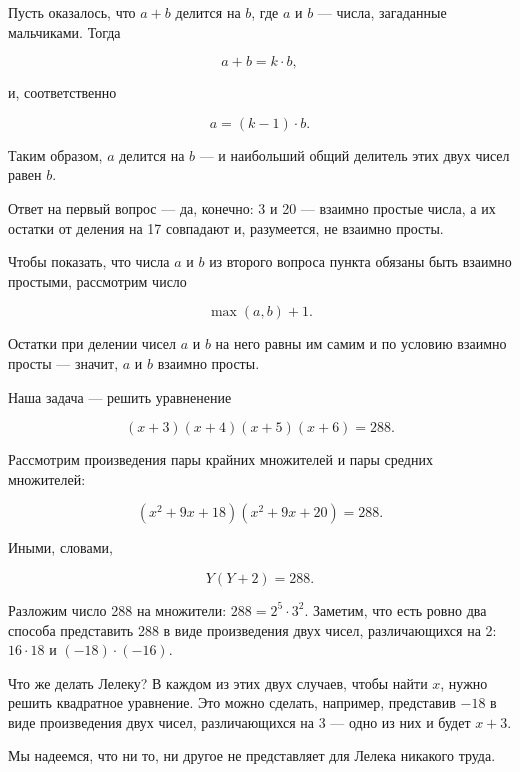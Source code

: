 ﻿
\begin{itemize}

\itA Пусть оказалось, что $a+b$ делится на $b$, где $a$ и $b$ — числа, загаданные мальчиками. Тогда

\vspace{-0.4cm}
$$a+b = k \cdot b,$$

\noindent и, соответственно

\vspace{-0.4cm}
$$a = (k-1) \cdot b.$$

Таким образом, $a$ делится на $b$ — и наибольший общий делитель этих двух чисел равен $b$.

\itB Ответ на первый вопрос — да, конечно: 3 и 20 — взаимно простые числа, а их остатки от деления на 17 совпадают и, разумеется, не взаимно просты.

Чтобы показать, что числа $a$ и $b$ из второго вопроса пункта обязаны быть взаимно простыми, рассмотрим число

\vspace{-0.4cm}
$$\max (a,b) +1.$$

\noindent Остатки при делении чисел $a$ и $b$ на него равны им самим и по условию взаимно просты — значит, $a$ и $b$ взаимно просты.

\itC Наша задача — решить уравненение

\vspace{-0.4cm}
$$(x+3)(x+4)(x+5)(x+6) = 288.$$

\noindent Рассмотрим произведения пары крайних множителей и пары средних множителей:

\vspace{-0.4cm}
$$(x^2 + 9x + 18)(x^2 + 9x + 20) = 288.$$

Иными, словами,

\vspace{-0.4cm}
$$Y(Y+2) = 288.$$

\noindent Разложим число 288 на множители: $288 = 2^5 \cdot 3^2$. Заметим, что есть ровно два способа представить 288 в виде произведения двух чисел, различающихся на 2: $16 \cdot 18$ и $(-18) \cdot (-16)$.

\ms Что же делать Лелеку? В каждом из этих двух случаев, чтобы найти $x$, нужно решить квадратное уравнение. Это можно сделать, например, представив $-18$ в виде произведения двух чисел, различающихся на 3 — одно из них и будет $x+3$.

\ms Мы надеемся, что ни то, ни другое не представляет для Лелека никакого труда.

\end{itemize}
